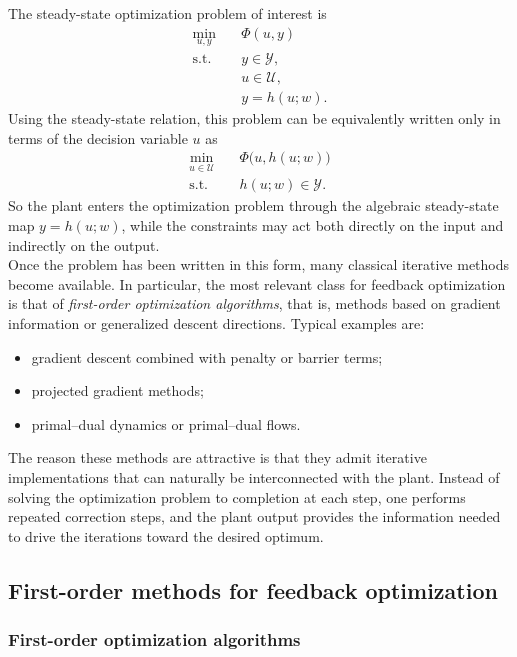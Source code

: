 The steady-state optimization problem of interest is
\[
\begin{aligned}
\min_{u,y}\quad & \Phi(u,y)\\
\text{s.t.}\quad & y \in \mathcal Y,\\
& u \in \mathcal U,\\
& y = h(u;w).
\end{aligned}
\]
Using the steady-state relation, this problem can be equivalently written only in terms of the decision variable $u$ as
\[
\begin{aligned}
\min_{u \in \mathcal U}\quad & \Phi\bigl(u,h(u;w)\bigr)\\
\text{s.t.}\quad & h(u;w) \in \mathcal Y.
\end{aligned}
\]
So the plant enters the optimization problem through the algebraic steady-state map $y=h(u;w)$, while the constraints may act both directly on the input and indirectly on the output.\\

Once the problem has been written in this form, many classical iterative methods become available. In particular, the most relevant class for feedback optimization is that of \emph{first-order optimization algorithms}, that is, methods based on gradient information or generalized descent directions. Typical examples are:
\begin{itemize}
    \item gradient descent combined with penalty or barrier terms;
    \item projected gradient methods;
    \item primal--dual dynamics or primal--dual flows.
\end{itemize}
The reason these methods are attractive is that they admit iterative implementations that can naturally be interconnected with the plant. Instead of solving the optimization problem to completion at each step, one performs repeated correction steps, and the plant output provides the information needed to drive the iterations toward the desired optimum.

\subsection{First-order methods for feedback optimization}
\subsubsection{First-order optimization algorithms}

